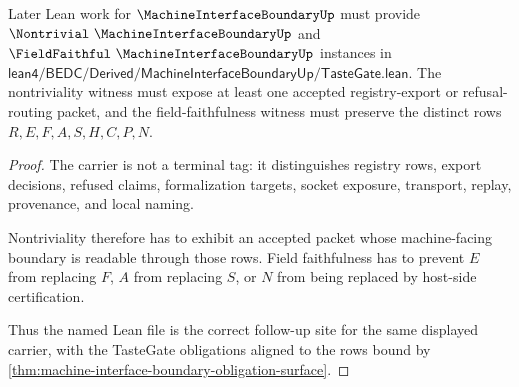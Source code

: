 \begin{theorem}
\label{thm:machine-interface-boundary-tastegate-handoff}
Later Lean work for $\MachineInterfaceBoundaryUp$ must provide $\Nontrivial\ \MachineInterfaceBoundaryUp$ and $\FieldFaithful\ \MachineInterfaceBoundaryUp$ instances in $\mathsf{lean4/BEDC/Derived/MachineInterfaceBoundaryUp/TasteGate.lean}$. The nontriviality witness must expose at least one accepted registry-export or refusal-routing packet, and the field-faithfulness witness must preserve the distinct rows $R,E,F,A,S,H,C,P,N$.
\end{theorem}
\begin{proof}
The carrier is not a terminal tag: it distinguishes registry rows, export decisions, refused claims, formalization targets, socket exposure, transport, replay, provenance, and local naming.

Nontriviality therefore has to exhibit an accepted packet whose machine-facing boundary is readable through those rows. Field faithfulness has to prevent $E$ from replacing $F$, $A$ from replacing $S$, or $N$ from being replaced by host-side certification.

Thus the named Lean file is the correct follow-up site for the same displayed carrier, with the TasteGate obligations aligned to the rows bound by \autoref{thm:machine-interface-boundary-obligation-surface}.
\end{proof}


